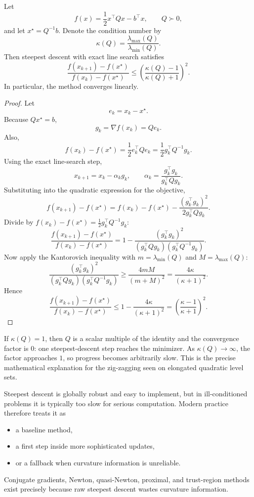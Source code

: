 \begin{theorem}\label{thm:l2-linear-convergence-rate-for-steepest-descent-on-quadratics}
	Let
	\[
		f(x)=\frac{1}{2}x^\top Qx-b^\top x,
		\qquad Q \succ 0,
	\]
	and let $x^\star=Q^{-1}b$. Denote the condition number by
	\[
		\kappa(Q)=\frac{\lambda_{\max}(Q)}{\lambda_{\min}(Q)}.
	\]
	Then steepest descent with exact line search satisfies
	\[
		\frac{f(x_{k+1})-f(x^\star)}{f(x_k)-f(x^\star)}
		\le
		\left(\frac{\kappa(Q)-1}{\kappa(Q)+1}\right)^2.
	\]
	In particular, the method converges linearly.
\end{theorem}
\begin{proof}
	Let
	\[
		e_k=x_k-x^\star.
	\]
	Because $Qx^\star=b$,
	\[
		g_k=\nabla f(x_k)=Qe_k.
	\]
	Also,
	\[
		f(x_k)-f(x^\star)=\frac{1}{2}e_k^\top Q e_k
		=\frac{1}{2}g_k^\top Q^{-1}g_k.
	\]
	Using the exact line-search step,
	\[
		x_{k+1}=x_k-\alpha_k g_k,
		\qquad
		\alpha_k=\frac{g_k^\top g_k}{g_k^\top Qg_k}.
	\]
	Substituting into the quadratic expression for the objective,
	\[
		f(x_{k+1})-f(x^\star)
		=
		f(x_k)-f(x^\star)-\frac{(g_k^\top g_k)^2}{2g_k^\top Qg_k}.
	\]
	Divide by $f(x_k)-f(x^\star)=\frac{1}{2}g_k^\top Q^{-1}g_k$:
	\[
		\frac{f(x_{k+1})-f(x^\star)}{f(x_k)-f(x^\star)}
		=
		1-
		\frac{(g_k^\top g_k)^2}{(g_k^\top Qg_k)(g_k^\top Q^{-1}g_k)}.
	\]
	Now apply the Kantorovich inequality with $m=\lambda_{\min}(Q)$ and $M=\lambda_{\max}(Q)$:
	\[
		\frac{(g_k^\top g_k)^2}{(g_k^\top Qg_k)(g_k^\top Q^{-1}g_k)}
		\ge
		\frac{4mM}{(m+M)^2}
		=
		\frac{4\kappa}{(\kappa+1)^2}.
	\]
	Hence
	\[
		\frac{f(x_{k+1})-f(x^\star)}{f(x_k)-f(x^\star)}
		\le
		1-\frac{4\kappa}{(\kappa+1)^2}
		=
		\left(\frac{\kappa-1}{\kappa+1}\right)^2.
	\]
\end{proof}

\begin{remark}
	If $\kappa(Q)=1$, then $Q$ is a scalar multiple of the identity and the convergence factor is $0$: one steepest-descent step reaches the minimizer. As $\kappa(Q)\to\infty$, the factor approaches $1$, so progress becomes arbitrarily slow. This is the precise mathematical explanation for the zig-zagging seen on elongated quadratic level sets.
\end{remark}

\begin{remark}
	Steepest descent is globally robust and easy to implement, but in ill-conditioned problems it is typically too slow for serious computation. Modern practice therefore treats it as
	\begin{itemize}
		\item a baseline method,
		\item a first step inside more sophisticated updates,
		\item or a fallback when curvature information is unreliable.
	\end{itemize}
	Conjugate gradients, Newton, quasi-Newton, proximal, and trust-region methods exist precisely because raw steepest descent wastes curvature information.
\end{remark}

